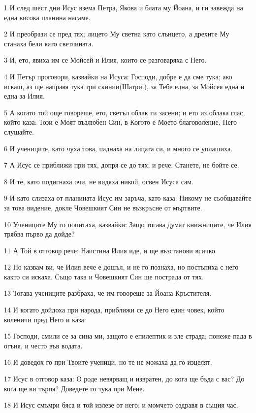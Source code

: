 \par 1 И след шест дни Исус взема Петра, Якова и блата му Йоана, и ги завежда на една висока планина насаме.
\par 2 И преобрази се пред тях; лицето Му светна като слънцето, а дрехите Му станаха бели като светлината.
\par 3 И, ето, явиха им се Мойсей и Илия, които се разговаряха с Него.
\par 4 И Петър проговори, казвайки на Исуса: Господи, добре е да сме тука; ако искаш, аз ще направя тука три скинии(Шатри.), за Тебе една, за Мойсея една и една за Илия.
\par 5 А когато той още говореше, ето, светъл облак ги засени; и ето из облака глас, който каза: Този е Моят възлюбен Син, в Когото е Моето благоволение, Него слушайте.
\par 6 И учениците, като чуха това, паднаха на лицата си, и много се уплашиха.
\par 7 А Исус се приближи при тях, допря се до тях, и рече: Станете, не бойте се.
\par 8 И те, като подигнаха очи, не видяха никой, освен Исуса сам.
\par 9 И като слизаха от планината Исус им заръча, като каза: Никому не съобщавайте за това видение, докле Човешкият Син не възкръсне от мъртвите.
\par 10 Учениците Му го попитаха, казвайки: Защо тогава думат книжниците, че Илия трябва първо да дойде?
\par 11 А Той в отговор рече: Наистина Илия иде, и ще възстанови всичко.
\par 12 Но казвам ви, че Илия вече е дошъл, и не го познаха, но постъпиха с него както си искаха. Също така и Човешкият Син ще пострада от тях.
\par 13 Тогава учениците разбраха, че им говореше за Йоана Кръстителя.
\par 14 И когато дойдоха при народа, приближи се до Него един човек, който коленичи пред Него и каза:
\par 15 Господи, смили се за сина ми, защото е епилептик и зле страда; понеже пада в огъня, и често във водата.
\par 16 И доведох го при Твоите ученици, но те не можаха да го изцелят.
\par 17 Исус в отговор каза: О роде невярващ и извратен, до кога ще бъда с вас? До кога ще ви търпя? Доведете го тука при Мене.
\par 18 И Исус смъмри бяса и той излезе от него; и момчето оздравя в същия час.
